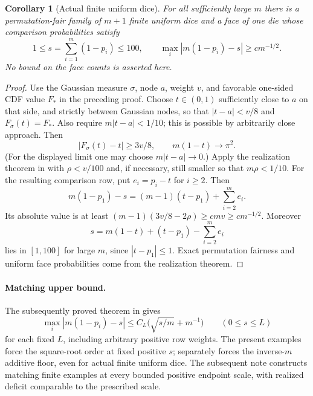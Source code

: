 \documentclass[11pt]{article}
\newtheorem{corollary}{Corollary}
\begin{document}
\begin{corollary}[Actual finite uniform dice]\label{dice}
For all sufficiently large $m$ there is a permutation-fair family of
$m+1$ finite uniform dice and a face of one die whose comparison
probabilities satisfy
\[
 1\le s=\sum_{i=1}^m(1-p_i)\le100,\qquad
 \max_i|m(1-p_i)-s|\ge c m^{-1/2}.
\]
No bound on the face counts is asserted here.
\end{corollary}
\begin{proof}
Use the Gaussian measure $\sigma$, node $a$, weight $v$, and
favorable one-sided CDF value $F_*$ in the preceding proof.
Choose $t\in(0,1)$ sufficiently close to $a$ on that side, and
strictly between Gaussian nodes, so that $|t-a|<v/8$ and
$F_\sigma(t)=F_*$. Also require $m|t-a|<1/10$; this is possible
by arbitrarily close approach. Then
\[
 |F_\sigma(t)-t|\ge3v/8,
 \qquad m(1-t)\longrightarrow\pi^2.
\]
(For the displayed limit one may choose $m|t-a|\to0$.)
Apply the realization theorem in
 with $\rho<v/100$ and,
if necessary, still smaller so that $m\rho<1/10$.
For the resulting comparison row, put $e_i=p_i-t$ for $i\ge2$.
Then
\[
 m(1-p_1)-s=(m-1)(t-p_1)+\sum_{i=2}^m e_i.
\]
Its absolute value is at least
$(m-1)(3v/8-2\rho)\ge c m v\ge c m^{-1/2}$.
Moreover
\[
 s=m(1-t)+(t-p_1)-\sum_{i=2}^m e_i
\]
lies in $[1,100]$ for large $m$, since $|t-p_1|\le1$.
Exact permutation fairness and uniform face probabilities come from
the realization theorem.
\end{proof}

\paragraph{Matching upper bound.}
The subsequently proved theorem in
gives
\[
 \max_i|m(1-p_i)-s|\le C_L\bigl(\sqrt{s/m}+m^{-1}\bigr)
 \qquad(0\le s\le L)
\]
for each fixed $L$, including arbitrary positive row weights.
The present examples force the square-root order at fixed positive $s$;
 separately forces the inverse-$m$
additive floor, even for actual finite uniform dice. The subsequent note
constructs matching finite examples at every bounded positive endpoint
scale, with realized deficit comparable to the prescribed scale.
\end{document}
